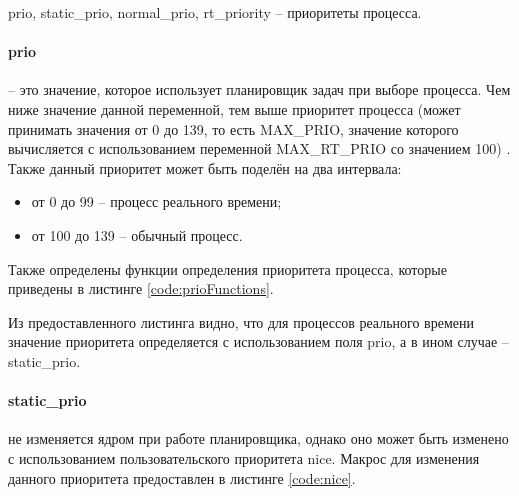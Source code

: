 prio, static\_prio, normal\_prio, rt\_priority -- приоритеты процесса.

\paragraph*{prio} -- это значение, которое использует планировщик задач при выборе процесса. Чем ниже значение данной переменной, тем выше приоритет процесса (может принимать значения от 0 до 139, то есть MAX\_PRIO, значение которого вычисляется с использованием переменной MAX\_RT\_PRIO со значением 100) \cite{linuxPriority}. Также данный приоритет может быть поделён на два интервала:
\begin{itemize}[leftmargin=1.6\parindent]
\item от 0 до 99 -- процесс реального времени;
\item от 100 до 139 -- обычный процесс.
\end{itemize}

Также определены функции определения приоритета процесса, которые приведены в листинге \ref{code:prioFunctions}.


Из предоставленного листинга видно, что для процессов реального времени значение приоритета определяется с использованием поля prio, а в ином случае -- static\_prio.

\paragraph*{static\_prio} не изменяется ядром при работе планировщика, однако оно может быть изменено с использованием пользовательского приоритета nice. Макрос для изменения данного приоритета предоставлен в листинге \ref{code:nice}.


